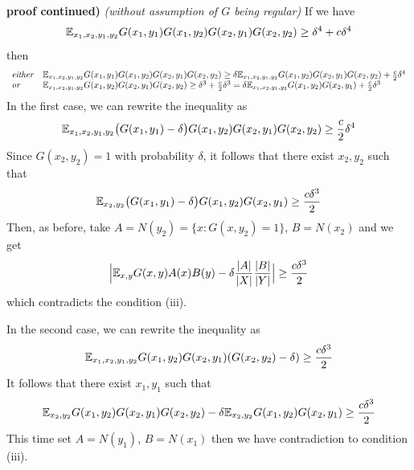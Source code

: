 \documentclass[10pt,a4paper]{report}
\newenvironment{proof}
{\begin{changemargin}{1cm}{0.5cm}
	}%
	{\end{changemargin}
}
\begin{document}
\begin{proof}
\textbf{proof continued)} \emph{(without assumption of $G$ being regular)} If we have
\begin{align*}
\mathbb{E}_{x_1, x_2, y_1, y_2} G(x_1, y_1) G(x_1,y_2) G(x_2,y_1) G(x_2,y_2) \geq \delta^4 + c\delta^4
\end{align*}
then
\begin{align*}
\begin{array}{ll}
\text{\emph{either}} & \mathbb{E}_{x_1, x_2, y_1, y_2} G(x_1, y_1) G(x_1,y_2) G(x_2,y_1) G(x_2,y_2) \geq \delta \mathbb{E}_{x_1, x_2, y_1, y_2} G(x_1,y_2) G(x_2,y_1) G(x_2,y_2) + \frac{c}{2} \delta^4 \\
\text{\emph{or}} & \mathbb{E}_{x_1, x_2, y_1, y_2} G(x_1,y_2) G(x_2,y_1) G(x_2,y_2) \geq \delta^3 + \frac{c}{2}\delta^3 = \delta \mathbb{E}_{x_1, x_2, y_1, y_2} G(x_1,y_2) G(x_2,y_1) + \frac{c}{2}\delta^3
\end{array}
\end{align*}
In the first case, we can rewrite the inequality as
\begin{align*}
\mathbb{E}_{x_1, x_2, y_1, y_2} \big( G(x_1,y_1) -\delta \big) G(x_1,y_2) G(x_2,y_1) G(x_2,y_2) \geq \frac{c}{2} \delta^4
\end{align*}
Since $G(x_2, y_2)=1$ with probability $\delta$, it follows that there exist $x_2, y_2$ such that
\begin{align*}
\mathbb{E}_{x_2, y_2} \big( G(x_1,y_1) -\delta \big) G(x_1,y_2) G(x_2,y_1) \geq \frac{c\delta^3}{2}
\end{align*}
Then, as before, take $A = N(y_2)= \{ x:G(x,y_2)=1 \}$, $B=N(x_2)$ and we get
\begin{align*}
\Big| \mathbb{E}_{x,y} G(x,y) A(x)B(y) - \delta \frac{|A|}{|X|} \frac{|B|}{|Y|} \Big| \geq \frac{c\delta^3}{2}
\end{align*}
which contradicts the condition (iii).

\quad In the second case, we can rewrite the inequality as
\begin{align*}
\mathbb{E}_{x_1, x_2, y_1, y_2} G(x_1,y_2) G(x_2,y_1) (G(x_2,y_2) - \delta) \geq \frac{c\delta^3}{2}
\end{align*}
It follows that there exist $x_1, y_1$ such that
\begin{align*}
\mathbb{E}_{x_2, y_2} G(x_1,y_2) G(x_2,y_1) G(x_2,y_2) - \delta \mathbb{E}_{x_2, y_2} G(x_1,y_2) G(x_2,y_1) \geq \frac{c\delta^3}{2}
\end{align*}
This time set $A = N(y_1)$, $B=N(x_1)$ then we have contradiction to condition (iii).

\eop
\end{proof}
\end{document}
